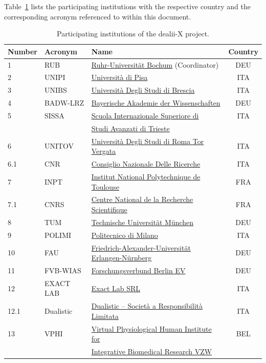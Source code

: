 \documentclass[a4paper,12pt]{article}
\begin{document}
Table~\ref{tab:participating_isntitutions} lists the participating institutions with the respective country and the corresponding acronym referenced to within this document.

\begin{center}
    \begin{table}[h!]
    \small
    \caption{Participating institutions of the dealii-X project.}
    \renewcommand{\arraystretch}{1.25}
    \label{tab:participating_isntitutions}
    \begin{tabular}{|l|l|l|c|}
    \hline
    \textbf{Number} & \textbf{Acronym} & \textbf{Name} & \textbf{Country} \\
    \hline
    1 & RUB   & \href{https://www.ruhr-uni-bochum.de/de}{Ruhr-Universit\"at Bochum} (Coordinator) & DEU \\
    2 & UNIPI & \href{https://www.unipi.it/}{Universit\`a di Pisa} & ITA \\
    3 & UNIBS & \href{https://www.unibs.it/it}{Universit\`a Degli Studi di Brescia} & ITA \\
    4 & BADW-LRZ & \href{https://badw.de/die-akademie.html}{Bayerische Akademie der Wissenschaften} & DEU \\
    5 & SISSA & \href{https://www.sissa.it/it}{Scuola Internazionale Superiore di} & ITA \\
      &       & \href{https://www.sissa.it/it}{Studi Avanzati di Trieste} & \\
    6 & UNITOV & \href{https://web.uniroma2.it/}{Universit\`a Degli Studi di Roma Tor Vergata} & ITA \\
    6.1 & CNR & \href{https://www.cnr.it/}{Consiglio Nazionale Delle Ricerche} & ITA \\
    7 & INPT & \href{https://www.inp-toulouse.fr/fr/index.html}{Institut National Polytechnique de Toulouse} & FRA \\
    7.1 & CNRS & \href{https://www.cnrs.fr/fr}{Centre National de la Recherche Scientifique} & FRA \\
    8 & TUM & \href{https://www.tum.de/}{Technische Universit\"at M\"unchen} & DEU \\
    9 & POLIMI & \href{https://www.polimi.it/}{Politecnico di Milano} & ITA \\
    10 & FAU & \href{https://www.fau.de/}{Friedrich-Alexander-Universität Erlangen-N\"urnberg} & DEU \\
    11 & FVB-WIAS & \href{https://www.fv-berlin.de/institute/wias}{Forschungsverbund Berlin EV} & DEU \\
    12 & EXACT LAB & \href{https://www.exact-lab.it/}{Exact Lab SRL} & ITA \\
    12.1 & Dualistic & \href{https://www.dualistic.it/}{Dualistic -- Societ\`a a Responsibilit\`a Limitata} & ITA \\
    13 & VPHI & \href{https://www.vph-institute.org/}{Virtual Physiological Human Institute for} & BEL\\
       &               & \href{https://www.vph-institute.org/}{Integrative Biomedical Research VZW} & \\
    \hline
    \end{tabular}
    \end{table}
\end{center}
\end{document}
